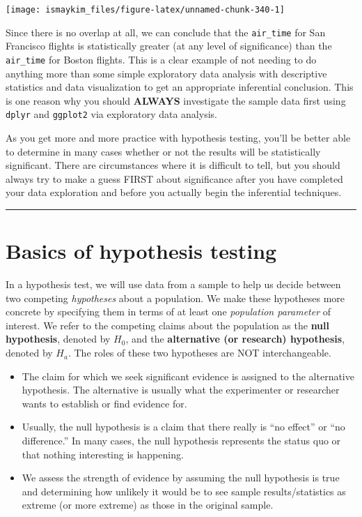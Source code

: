 \documentclass[12pt, krantz2,]{krantz}
\providecommand{\tightlist}{%
  \setlength{\itemsep}{0pt}\setlength{\parskip}{0pt}}
\begin{document}
\begin{center}\texttt{[image: ismaykim\_files/figure-latex/unnamed-chunk-340-1]} \end{center}

Since there is no overlap at all, we can conclude that the \texttt{air\_time} for San Francisco flights is statistically greater (at any level of significance) than the \texttt{air\_time} for Boston flights. This is a clear example of not needing to do anything more than some simple exploratory data analysis with descriptive statistics and data visualization to get an appropriate inferential conclusion. This is one reason why you should \textbf{ALWAYS} investigate the sample data first using \texttt{dplyr} and \texttt{ggplot2} via exploratory data analysis.

As you get more and more practice with hypothesis testing, you'll be better able to determine in many cases whether or not the results will be statistically significant. There are circumstances where it is difficult to tell, but you should always try to make a guess FIRST about significance after you have completed your data exploration and before you actually begin the inferential techniques.

\begin{center}\rule{0.5\linewidth}{\linethickness}\end{center}

\hypertarget{ht-basics}{%
\section{Basics of hypothesis testing}\label{ht-basics}}

In a hypothesis test, we will use data from a sample to help us decide between two competing \emph{hypotheses} about a population. We make these hypotheses more concrete by specifying them in terms of at least one \emph{population parameter} of interest. We refer to the competing claims about the population as the \textbf{null hypothesis}, denoted by \(H_0\), and the \textbf{alternative (or research) hypothesis}, denoted by \(H_a\). The roles of these two hypotheses are NOT interchangeable.

\begin{itemize}
\tightlist
\item
  The claim for which we seek significant evidence is assigned to the alternative hypothesis. The alternative is usually what the experimenter or researcher wants to establish or find evidence for.
\item
  Usually, the null hypothesis is a claim that there really is ``no effect'' or ``no difference.'' In many cases, the null hypothesis represents the status quo or that nothing interesting is happening.\\
\item
  We assess the strength of evidence by assuming the null hypothesis is true and determining how unlikely it would be to see sample results/statistics as extreme (or more extreme) as those in the original sample.
\end{itemize}
\end{document}
